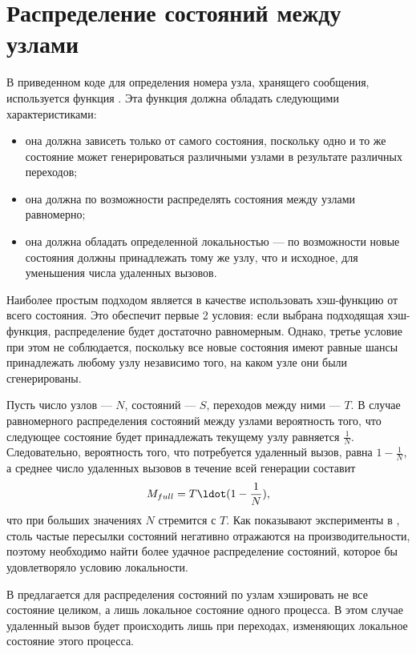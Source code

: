 \section{Распределение состояний между узлами}
\label{sec:state-partition}

В приведенном коде для определения номера узла, хранящего сообщения,
используется функция . Эта функция должна обладать следующими
характеристиками:

\begin{itemize}
\item она должна зависеть только от самого состояния, поскольку одно и
  то же состояние может генерироваться различными узлами в результате
  различных переходов;

\item она должна по возможности распределять состояния между узлами
  равномерно;

\item она должна обладать определенной локальностью — по возможности
  новые состояния должны принадлежать тому же узлу, что и исходное,
  для уменьшения числа удаленных вызовов.
\end{itemize}

Наиболее простым подходом является в качестве  использовать
хэш-функцию от всего состояния. Это обеспечит первые 2 условия: если
выбрана подходящая хэш-функция, распределение будет достаточно
равномерным. Однако, третье условие при этом не соблюдается, поскольку
все новые состояния имеют равные шансы принадлежать любому узлу
независимо того, на каком узле они были сгенерированы.

Пусть число узлов — $N$, состояний — $S$, переходов между ними —
$T$. В случае равномерного распределения состояний между узлами
вероятность того, что следующее состояние будет принадлежать текущему
узлу равняется $\frac{1}{N}$. Следовательно, вероятность того, что
потребуется удаленный вызов, равна $1 - \frac{1}{N}$, а среднее число
удаленных вызовов в течение всей генерации составит
\begin{equation}
  \label{eq:nmsg-full-hash}
  M_{full} = T \ldot (1 - \frac{1}{N}) ,
\end{equation}
что при больших значениях $N$ стремится с $T$. Как
показывают эксперименты в \cite{LT99}, столь частые пересылки
состояний негативно отражаются на производительности, поэтому
необходимо найти более удачное распределение состояний, которое бы
удовлетворяло условию локальности.

В \cite{LT99} предлагается для распределения состояний по узлам
хэшировать не все состояние целиком, а лишь локальное состояние одного
процесса. В этом случае удаленный вызов будет происходить лишь при
переходах, изменяющих локальное состояние этого процесса.

